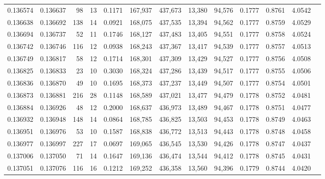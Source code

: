 \begin{tabular}{rrrrrrrrrrrrr}
0.136574 & 0.136637 &    98 &  13 &                                     0.1171 & 167,937 & 437,673 &  13,380 &  94,576 & 0.1777 & 0.8761 & 4.0542 \\
0.136638 & 0.136692 &   138 &  14 &                                     0.0921 & 168,075 & 437,535 &  13,394 &  94,562 & 0.1777 & 0.8759 & 4.0529 \\
0.136694 & 0.136737 &    52 &  11 &                                     0.1746 & 168,127 & 437,483 &  13,405 &  94,551 & 0.1777 & 0.8758 & 4.0524 \\
0.136742 & 0.136746 &   116 &  12 &                                     0.0938 & 168,243 & 437,367 &  13,417 &  94,539 & 0.1777 & 0.8757 & 4.0513 \\
0.136749 & 0.136817 &    58 &  12 &                                     0.1714 & 168,301 & 437,309 &  13,429 &  94,527 & 0.1777 & 0.8756 & 4.0508 \\
0.136825 & 0.136833 &    23 &  10 &                                     0.3030 & 168,324 & 437,286 &  13,439 &  94,517 & 0.1777 & 0.8755 & 4.0506 \\
0.136836 & 0.136870 &    49 &  10 &                                     0.1695 & 168,373 & 437,237 &  13,449 &  94,507 & 0.1777 & 0.8754 & 4.0501 \\
0.136873 & 0.136881 &   216 &  28 &                                     0.1148 & 168,589 & 437,021 &  13,477 &  94,479 & 0.1778 & 0.8752 & 4.0481 \\
0.136884 & 0.136926 &    48 &  12 &                                     0.2000 & 168,637 & 436,973 &  13,489 &  94,467 & 0.1778 & 0.8751 & 4.0477 \\
0.136932 & 0.136948 &   148 &  14 &                                     0.0864 & 168,785 & 436,825 &  13,503 &  94,453 & 0.1778 & 0.8749 & 4.0463 \\
0.136951 & 0.136976 &    53 &  10 &                                     0.1587 & 168,838 & 436,772 &  13,513 &  94,443 & 0.1778 & 0.8748 & 4.0458 \\
0.136977 & 0.136997 &   227 &  17 &                                     0.0697 & 169,065 & 436,545 &  13,530 &  94,426 & 0.1778 & 0.8747 & 4.0437 \\
0.137006 & 0.137050 &    71 &  14 &                                     0.1647 & 169,136 & 436,474 &  13,544 &  94,412 & 0.1778 & 0.8745 & 4.0431 \\
0.137051 & 0.137076 &   116 &  16 &                                     0.1212 & 169,252 & 436,358 &  13,560 &  94,396 & 0.1779 & 0.8744 & 4.0420 \\

\end{tabular}

